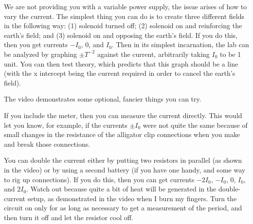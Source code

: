 \observations

We are not providing you with a variable power supply, the issue arises of how to vary the current.
The simplest thing you can do is to create three different fields in the following way: (1) solenoid turned off;
(2) solenoid on and reinforcing the earth's field; and (3) solenoid on and opposing the earth's field.
If you do this, then you get currents $-I_0$, 0, and $I_0$. Then in its simplest incarnation,
the lab can be analyzed by graphing $\pm T^{-2}$ against the current, arbitrarily taking $I_0$ to be 1 unit. You can then test theory, which
predicts that this graph should be a line (with the x intercept being the current required in order to
cancel the earth's field).

The video demonstrates some optional, fancier things you can try.

If you include the meter, then you can measure
the current directly. This would let you know, for example, if the currents $\pm I_0$ were not quite the same
because of small changes in the resistance of the alligator clip connections when you make and break those connections.

You can double the current either by putting two resistors in parallel (as shown in the video) or by
using a second battery (if you have one handy, and some way to rig up connections). 
If you do this, then you can get currents $-2I_0$, $-I_0$, 0, $I_0$, and $2I_0$.
Watch out because
quite a bit of heat will be generated in the double-current setup, as demonstrated in the video when I
burn my fingers. Turn the circuit on only for as long as necessary to get a measurement of the period,
and then turn it off and let the resistor cool off.





